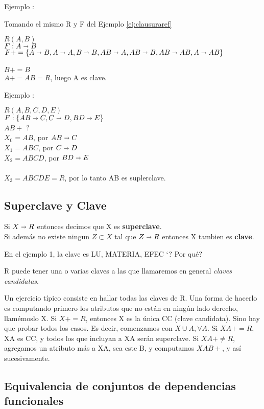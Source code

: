 \documentclass[10pt, a4paper,english,spanish]{article}
\newcommand{\imp}{\shortrightarrow}
\begin{document}
Ejemplo \label{ej:clausuraconj}:

Tomando el mismo R y F del Ejemplo \ref{ej:clausuraref}

$R(A,B)$\\
$F: A \imp B$\\
$F+ = \{A \imp B, A \imp A, B \imp B, AB \imp A, AB \imp B, AB  \imp AB, A \imp AB\}$\\
\\
$B+ = B$\\
$A+ = AB = R$, luego A es clave.

Ejemplo \label{ej:clasuraconj2}:

$R(A,B,C,D,E)$\\
$F: \{AB \imp C, C \imp D, BD \imp E \}$\\
$AB+$ ? \\
$X_0=AB$, por $AB\imp C$\\
$X_1=ABC$, por $C\imp D$\\
$X_2=ABCD$, por $BD\imp E$\\
\\
$X_3=ABCDE=R$, por lo tanto AB es suplerclave.

\subsection{Superclave y Clave}
Si $X\imp R$ entonces decimos que X es \textbf{superclave}.\\
Si adem\'as no existe ningun $Z \subset X$ tal que $Z \imp R$ entonces
X tambien es \textbf{clave}.

En el ejemplo 1, la clave es {LU, MATERIA, EFEC} `? Por qu\'e?

R puede tener una o varias claves a las que llamaremos en general \textit{claves candidatas}.

Un ejercicio t\'ipico consiste en hallar todas las claves de R.
Una forma de hacerlo es computando primero los atributos que no est\'an en ning\'un lado
derecho, llam\'emoslo X. Si $X+ = R$, entonces X es la \'unica CC (clave candidata).
Sino hay que probar todos los casos.
Es decir, comenzamos con $X \cup A , \forall A$. Si $XA+ = R$, XA es CC, y todos los
que incluyan a XA ser\'an superclave. Si $XA+ \not = R$, agregamos un atributo
m\'as a XA, sea este B, y computamos $XAB+$, y as\'i sucesivamente.


\subsection{Equivalencia de conjuntos de dependencias funcionales}
\end{document}
